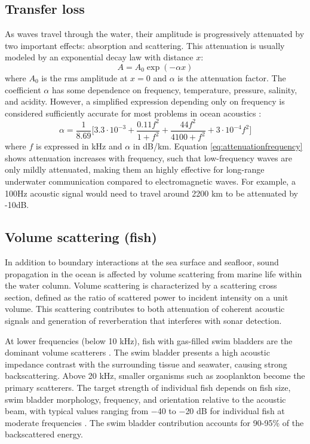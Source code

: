 \documentclass[fleqn]{jaes}
\begin{document}
\subsection{Transfer loss}
As waves travel through the water, their amplitude is progressively attenuated by two important effects: absorption and scattering. This attenuation is usually modeled by an exponential decay law with distance $x$:
\begin{equation}
    A = A_0 \exp (-\alpha x)
    \label{eq:attenuationdecay}
\end{equation}
where $A_0$ is the rms amplitude at $x=0$ and $\alpha$ is the attenuation factor.
The coefficient $\alpha$ has some dependence on frequency, temperature, pressure, salinity, and acidity. However, a simplified expression depending only on frequency is considered sufficiently accurate for most problems in ocean acoustics \cite{Jensen, urick1979}: 
\begin{equation}
    \alpha = \frac{1}{8.69} \big[ 3.3 \cdot 10^{-3} + \frac{0.11f^2}{1+f^2} + \frac{44f^2}{4100+f^2} + 3\cdot 10^{-4} f^2\big]
    \label{eq:attenuationfrequency}
\end{equation}
where $f$ is expressed in kHz and $\alpha$ in dB/km. Equation \ref{eq:attenuationfrequency} shows attenuation increases with frequency, such that low-frequency waves are only mildly attenuated, making them an highly effective for long-range underwater communication compared to electromagnetic waves. For example, a 100Hz acoustic signal would need to travel around 2200 km to be attenuated by -10dB.

\subsection{Volume scattering (fish)}

In addition to boundary interactions at the sea surface and seafloor, sound propagation in the ocean is affected by volume scattering from marine life within the water column. Volume scattering is characterized by a scattering cross section, defined as the ratio of scattered power to incident intensity on a unit volume. This scattering contributes to both attenuation of coherent acoustic signals and generation of reverberation that interferes with sonar detection.

At lower frequencies (below 10 kHz), fish with gas-filled swim bladders are the dominant volume scatterers \cite{Jensen}. The swim bladder presents a high acoustic impedance contrast with the surrounding tissue and seawater, causing strong backscattering. Above 20 kHz, smaller organisms such as zooplankton become the primary scatterers. The target strength of individual fish depends on fish size, swim bladder morphology, frequency, and orientation relative to the acoustic beam, with typical values ranging from $-$40 to $-$20 dB for individual fish at moderate frequencies \cite{Foote1983}. The swim bladder contribution accounts for 90-95\% of the backscattered energy.
\end{document}
